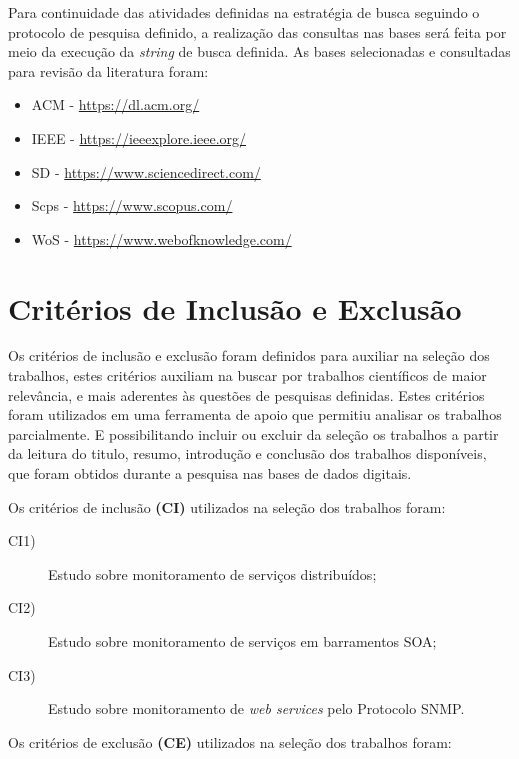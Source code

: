 Para continuidade das atividades definidas na estratégia de busca seguindo o protocolo de pesquisa definido, a realização das consultas nas bases será feita por meio da execução da \textit{string} de busca definida. As bases selecionadas e consultadas para revisão da literatura foram:
\begin{itemize}
\item \acrlong{ACM} - \url{https://dl.acm.org/}
\item \acrlong{IEEE} - \url{https://ieeexplore.ieee.org/}
\item \acrlong{SD} - \url{https://www.sciencedirect.com/}
\item \acrlong{Scps} - \url{https://www.scopus.com/}
\item \acrlong{WoS} - \url{https://www.webofknowledge.com/}
\end{itemize}


\section{Critérios de Inclusão e Exclusão}
\label{sec:cIncExc}
Os critérios de inclusão e exclusão foram definidos para auxiliar na seleção dos trabalhos, estes critérios auxiliam na buscar por trabalhos científicos de maior relevância, e mais aderentes às questões de pesquisas definidas. Estes critérios foram utilizados em uma ferramenta de apoio que permitiu analisar os trabalhos parcialmente. E possibilitando incluir ou excluir da seleção os trabalhos a partir da leitura do titulo, resumo, introdução e conclusão dos trabalhos disponíveis, que foram obtidos durante a pesquisa nas bases de dados digitais.    

Os critérios de inclusão \textbf{(CI)} utilizados na seleção dos trabalhos foram:

\begin{description}

\item[CI1)] Estudo sobre monitoramento de serviços distribuídos;
\item[CI2)] Estudo sobre monitoramento de serviços em barramentos \acrshort{SOA};
\item[CI3)] Estudo sobre monitoramento de \textit{web services} pelo Protocolo \acrshort{SNMP}.
\end{description}

Os critérios de exclusão \textbf{(CE)} utilizados na seleção dos trabalhos foram:

